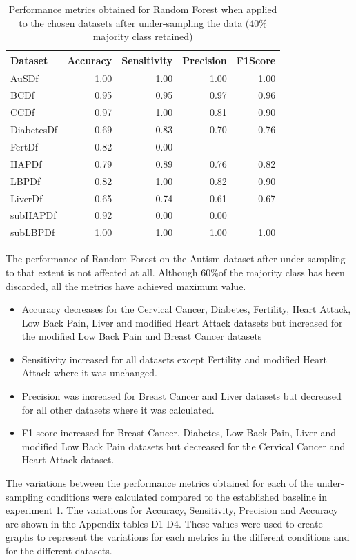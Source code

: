 \begin{table}[ht]
\centering
\begin{tabular}{lrrrr}
  \hline
  \rowcolor{LightCyan}
Dataset & Accuracy & Sensitivity & Precision & F1Score \\ 
  \hline
AuSDf & 1.00 & 1.00 & 1.00 & 1.00 \\ 
  BCDf & 0.95 & 0.95 & 0.97 & 0.96 \\ 
  CCDf & 0.97 & 1.00 & 0.81 & 0.90 \\ 
  DiabetesDf & 0.69 & 0.83 & 0.70 & 0.76 \\ 
  FertDf & 0.82 & 0.00 &  &  \\ 
  HAPDf & 0.79 & 0.89 & 0.76 & 0.82 \\ 
  LBPDf & 0.82 & 1.00 & 0.82 & 0.90 \\ 
  LiverDf & 0.65 & 0.74 & 0.61 & 0.67 \\ 
  subHAPDf & 0.92 & 0.00 & 0.00 &  \\ 
  subLBPDf & 1.00 & 1.00 & 1.00 & 1.00 \\ 
   \hline
\end{tabular}
\caption{Performance metrics obtained for Random Forest when applied to the chosen datasets after under-sampling the data (40\% majority class retained)}
\label{tab:RfMetrics40}
\end{table}

The performance of Random Forest on the Autism dataset after under-sampling to that extent is not affected at all. Although 60\%of the majority class has been discarded, all the metrics have achieved maximum value.
\begin{itemize}
    \item Accuracy decreases for the Cervical Cancer, Diabetes, Fertility, Heart Attack, Low Back Pain, Liver and modified Heart Attack datasets but increased for the modified Low Back Pain and Breast Cancer datasets
    \item Sensitivity increased for all datasets except Fertility and modified Heart Attack where it was unchanged.
    \item Precision was increased for Breast Cancer and Liver datasets but decreased for all other datasets where it was calculated.
    \item F1 score increased for Breast Cancer, Diabetes, Low Back Pain, Liver and modified Low Back Pain datasets but decreased for the Cervical Cancer and Heart Attack dataset.
\end{itemize}

The variations between the performance metrics obtained for each of the under-sampling conditions were calculated compared to the established baseline in experiment 1.\newline
The variations for Accuracy, Sensitivity, Precision and Accuracy are shown in the Appendix tables D1-D4.
These values were used to create graphs to represent the variations for each metrics in the different conditions and for the different datasets.\newline


